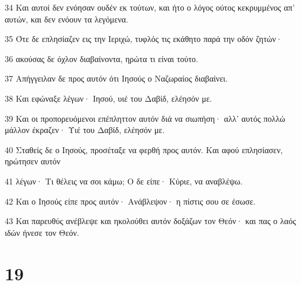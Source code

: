 \par 34 Και αυτοί δεν ενόησαν ουδέν εκ τούτων, και ήτο ο λόγος ούτος κεκρυμμένος απ' αυτών, και δεν ενόουν τα λεγόμενα.
\par 35 Ότε δε επλησίαζεν εις την Ιεριχώ, τυφλός τις εκάθητο παρά την οδόν ζητών·
\par 36 ακούσας δε όχλον διαβαίνοντα, ηρώτα τι είναι τούτο.
\par 37 Απήγγειλαν δε προς αυτόν ότι Ιησούς ο Ναζωραίος διαβαίνει.
\par 38 Και εφώναξε λέγων· Ιησού, υιέ του Δαβίδ, ελέησόν με.
\par 39 Και οι προπορευόμενοι επέπληττον αυτόν διά να σιωπήση· αλλ' αυτός πολλώ μάλλον έκραζεν· Υιέ του Δαβίδ, ελέησόν με.
\par 40 Σταθείς δε ο Ιησούς, προσέταξε να φερθή προς αυτόν. Και αφού επλησίασεν, ηρώτησεν αυτόν
\par 41 λέγων· Τι θέλεις να σοι κάμω; Ο δε είπε· Κύριε, να αναβλέψω.
\par 42 Και ο Ιησούς είπε προς αυτόν· Ανάβλεψον· η πίστις σου σε έσωσε.
\par 43 Και παρευθύς ανέβλεψε και ηκολούθει αυτόν δοξάζων τον Θεόν· και πας ο λαός ιδών ήνεσε τον Θεόν.

\chapter{19}

